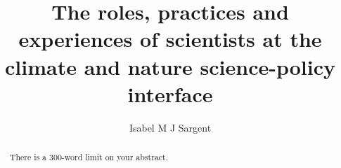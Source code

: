 
\title{The roles, practices and experiences of scientists at the climate and nature science-policy interface}
\author{Isabel M J Sargent}
\raggedbottom
\maketitle

\newpage
\makedeclaration

\begin{abstract} %
There is a 300-word limit on your abstract.
\end{abstract}

